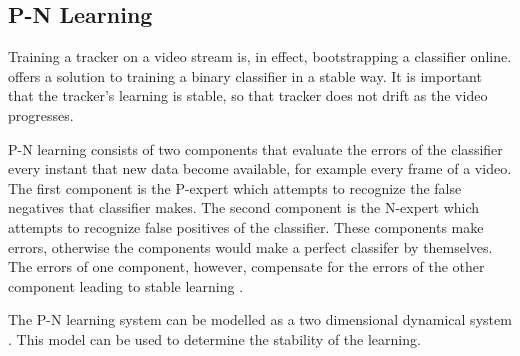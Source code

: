 \subsection{P-N Learning} \label{sec:pnlearning}
  Training a tracker on a video stream is, in effect, bootstrapping a classifier online.
  \citeauthor{PNLearning} \cite{PNLearning} offers a solution to training a binary classifier in a stable way.
  It is important that the tracker's learning is stable, so that tracker does not drift as the video progresses.

  P-N learning consists of two components that evaluate the errors of the classifier every instant that new data become available, for example every frame of a video.
  The first component is the P-expert which attempts to recognize the false negatives that classifier makes.
  The second component is the N-expert which attempts to recognize false positives of the classifier.
  These components make errors, otherwise the components would make a perfect classifer by themselves.
  The errors of one component, however, compensate for the errors of the other component leading to stable learning \cite{Kalal2011}.

  The P-N learning system can be modelled as a two dimensional dynamical system \cite{PNLearning} \cite{Kalal2011}.
  This model can be used to determine the stability of the learning.
